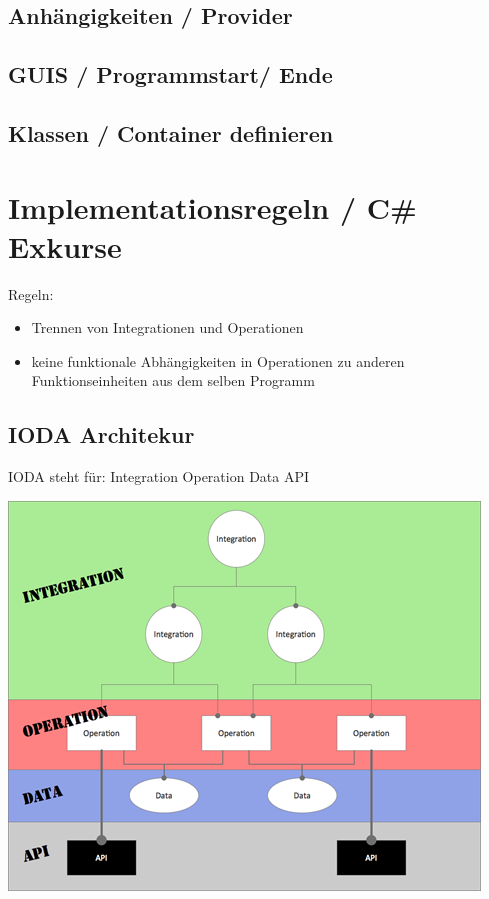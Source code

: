 \documentclass[11pt]{article}
\begin{document}
\subsection{Anhängigkeiten / Provider}
\label{sec:orgheadline15}
\subsection{GUIS / Programmstart/ Ende}
\label{sec:orgheadline16}
\subsection{Klassen / Container definieren}
\label{sec:orgheadline17}

\section{Implementationsregeln / C\# Exkurse}
\label{sec:orgheadline44}

Regeln:
\begin{itemize}
\item Trennen von Integrationen und Operationen
\item keine funktionale Abhängigkeiten in Operationen zu anderen Funktionseinheiten aus dem selben Programm
\end{itemize}

\subsection{IODA Architekur}
\label{sec:orgheadline25}
IODA steht für: Integration Operation Data API

\includegraphics[width=.9\linewidth]{./img/ioda1.png}
\end{document}
